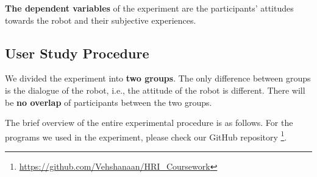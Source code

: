 \documentclass[conference]{IEEEtran}
\begin{document}
\textbf{The dependent variables} of the experiment are the participants' attitudes towards the robot and their subjective experiences.


\subsection{User Study Procedure}
\label{section:User Study Procedure}

We divided the experiment into \textbf{two groups}. The only difference between groups is the dialogue of the robot, i.e., the attitude of the robot is different. There will be \textbf{no overlap} of participants between the two groups.

The brief overview of the entire experimental procedure is as follows. For the programs we used in the experiment, please check our GitHub repository \footnote[1]{\url{https://github.com/Vehshanaan/HRI_Coursework}}.

\end{document}
